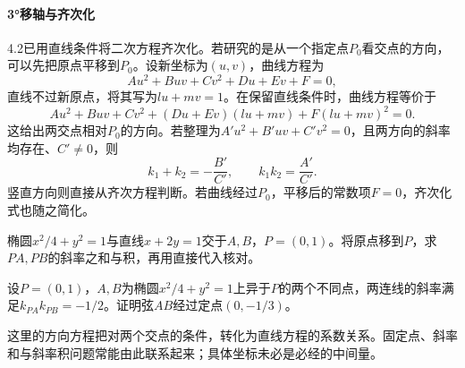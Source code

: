 \paragraph{3°移轴与齐次化} \mbox{}

4.2已用直线条件将二次方程齐次化。若研究的是从一个指定点\(P_0\)看交点的方向，可以先把原点平移到\(P_0\)。设新坐标为\((u,v)\)，曲线方程为
\begin{equation*}
    Au^2+Buv+Cv^2+Du+Ev+F=0,
\end{equation*}
直线不过新原点，将其写为\(lu+mv=1\)。在保留直线条件时，曲线方程等价于
\begin{equation}\label{eq:quadratic-shifted-homogenization}
    Au^2+Buv+Cv^2+(Du+Ev)(lu+mv)+F(lu+mv)^2=0 .
\end{equation}
这给出两交点相对\(P_0\)的方向。若整理为\(A'u^2+B'uv+C'v^2=0\)，且两方向的斜率均存在、\(C'\ne0\)，则
\begin{equation}\label{eq:quadratic-homogenized-slope-sum-product}
    k_1+k_2=-\frac{B'}{C'},\qquad
    k_1k_2=\frac{A'}{C'} .
\end{equation}
竖直方向则直接从齐次方程判断。若曲线经过\(P_0\)，平移后的常数项\(F=0\)，齐次化式也随之简化。

\par\noindent\begin{minipage}{\linewidth}
\begin{example}
椭圆\(x^2/4+y^2=1\)与直线\(x+2y=1\)交于\(A,B\)，\(P=(0,1)\)。将原点移到\(P\)，求\(PA,PB\)的斜率之和与积，再用直接代入核对。
\end{example}
\end{minipage}\par


\par\noindent\begin{minipage}{\linewidth}
\begin{example}
设\(P=(0,1)\)，\(A,B\)为椭圆\(x^2/4+y^2=1\)上异于\(P\)的两个不同点，两连线的斜率满足\(k_{PA}k_{PB}=-1/2\)。证明弦\(AB\)经过定点\((0,-1/3)\)。
\end{example}
\end{minipage}\par


这里的方向方程把对两个交点的条件，转化为直线方程的系数关系。固定点、斜率和与斜率积问题常能由此联系起来；具体坐标未必是必经的中间量。

